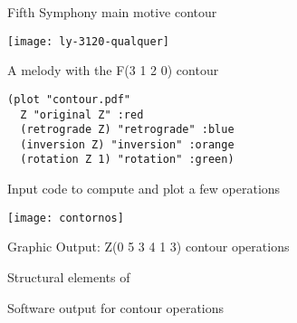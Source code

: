 \documentclass[a0paper]{sciposter}
\begin{document}
\begin{center}
\begin{multicols}{2}

\begin{figure}
  \centering
  \subfigure[Contour F(3 1 2 0)]{
    \texttt{[image: c-3120]}
    \label{fig:c-3120}
  }
  \caption{Fifth Symphony main motive contour}
  \label{fig:5a-sinfonia}
\end{figure}

\begin{figure}
  \centering
  \texttt{[image: ly-3120-qualquer]}
  \caption{A melody with the F(3 1 2 0) contour}
  \label{fig:ly-3120}
\end{figure}

\begin{figure}
  \centering
\begin{verbatim}
(plot "contour.pdf"
  Z "original Z" :red
  (retrograde Z) "retrograde" :blue
  (inversion Z) "inversion" :orange
  (rotation Z 1) "rotation" :green)
\end{verbatim}%
  \caption{Input code to compute and plot a few operations}
  \label{fig:operations-code}
\end{figure}

\begin{figure}
  \centering
  \texttt{[image: contornos]}
  \caption{Graphic Output: Z(0 5 3 4 1 3) contour operations}
  \label{fig:operacoes}
\end{figure}

\begin{figure}
  \centering

  \caption{Structural elements of }
  \label{fig:elementos-fugato}
\end{figure}

\begin{figure}
  \centering
  \caption{Software output for  contour operations}
  \label{fig:output-fugato}
\end{figure}


\end{multicols}
\end{center}
\end{document}
